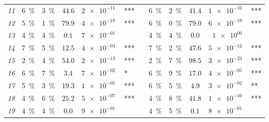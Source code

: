 \begin{tabular}{lcccr@{\hskip0pt}llcccr@{\hskip0pt}l}
\textit{11} & \SI{6}{\percent} & \SI{3}{\percent} & $44.6$ & $\SI{2e-11}{}$ & *** && \SI{6}{\percent} & \SI{2}{\percent} & $41.4$ & $\SI{1e-10}{}$ & *** \\
\textit{12} & \SI{5}{\percent} & \SI{1}{\percent} & $79.9$ & $\SI{4e-19}{}$ & *** && \SI{6}{\percent} & \SI{0}{\percent} & $79.0$ & $\SI{6e-19}{}$ & *** \\
\textit{13} & \SI{4}{\percent} & \SI{4}{\percent} & $0.1$ & $\SI{7e-01}{}$ &  && \SI{4}{\percent} & \SI{4}{\percent} & $0.0$ & $\SI{1e+00}{}$ &  \\
\textit{14} & \SI{7}{\percent} & \SI{5}{\percent} & $12.5$ & $\SI{4e-04}{}$ & *** && \SI{7}{\percent} & \SI{2}{\percent} & $47.6$ & $\SI{5e-12}{}$ & *** \\
\textit{15} & \SI{2}{\percent} & \SI{4}{\percent} & $54.0$ & $\SI{2e-13}{}$ & *** && \SI{2}{\percent} & \SI{7}{\percent} & $98.5$ & $\SI{3e-23}{}$ & *** \\
\textit{16} & \SI{6}{\percent} & \SI{7}{\percent} & $3.4$ & $\SI{7e-02}{}$ & * && \SI{6}{\percent} & \SI{9}{\percent} & $17.0$ & $\SI{4e-05}{}$ & *** \\
\textit{17} & \SI{5}{\percent} & \SI{3}{\percent} & $19.3$ & $\SI{1e-05}{}$ & *** && \SI{6}{\percent} & \SI{5}{\percent} & $4.9$ & $\SI{3e-02}{}$ & ** \\
\textit{18} & \SI{4}{\percent} & \SI{6}{\percent} & $25.2$ & $\SI{5e-07}{}$ & *** && \SI{4}{\percent} & \SI{8}{\percent} & $41.8$ & $\SI{1e-10}{}$ & *** \\
\textit{19} & \SI{4}{\percent} & \SI{4}{\percent} & $0.0$ & $\SI{9e-01}{}$ &  && \SI{4}{\percent} & \SI{5}{\percent} & $0.1$ & $\SI{8e-01}{}$ &  \\
\bottomrule\end{tabular}